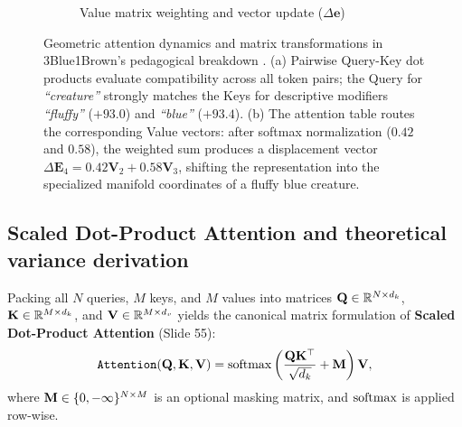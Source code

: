 \documentclass[../../../main.tex]{subfiles}
\begin{document}
\begin{figure}[htbp]
\begin{subfigure}[b]{0.48\textwidth}
{%
    }
    \caption{Value matrix weighting and vector update ($\Delta \mathbf{e}$)}
    \label{fig:3b1b_value_table_ch5}
\end{subfigure}
\caption{Geometric attention dynamics and matrix transformations in 3Blue1Brown's pedagogical breakdown \cite{sanderson2024attention}. (a) Pairwise Query-Key dot products evaluate compatibility across all token pairs; the Query for \emph{``creature''} strongly matches the Keys for descriptive modifiers \emph{``fluffy''} ($+93.0$) and \emph{``blue''} ($+93.4$). (b) The attention table routes the corresponding Value vectors: after softmax normalization ($0.42$ and $0.58$), the weighted sum produces a displacement vector $\Delta \mathbf{E}_4 = 0.42 \mathbf{V}_2 + 0.58 \mathbf{V}_3$, shifting the representation into the specialized manifold coordinates of a fluffy blue creature.}
\label{fig:3b1b_query_key_creature_ch5}
\end{figure}

\subsection{Scaled Dot-Product Attention and theoretical variance derivation}
\label{subsec:scaled_dot_product_math}

Packing all $N$ queries, $M$ keys, and $M$ values into matrices $\mathbf{Q} \in \mathbb{R}^{N \times d_k}$, $\mathbf{K} \in \mathbb{R}^{M \times d_k}$, and $\mathbf{V} \in \mathbb{R}^{M \times d_v}$ yields the canonical matrix formulation of \textbf{Scaled Dot-Product Attention} \cite{vaswani2017} (Slide 55):
\begin{equation}
\label{eq:scaled_dot_product_full_matrix}
\text{\texttt{Attention}}(\mathbf{Q}, \mathbf{K}, \mathbf{V}) = \operatorname{\mathrm{softmax}}\left( \frac{\mathbf{Q} \mathbf{K}^\top}{\sqrt{d_k}} + \mathbf{M} \right) \mathbf{V},
\end{equation}
where $\mathbf{M} \in \{0, -\infty\}^{N \times M}$ is an optional masking matrix, and $\operatorname{\mathrm{softmax}}$ is applied row-wise.
\end{document}
